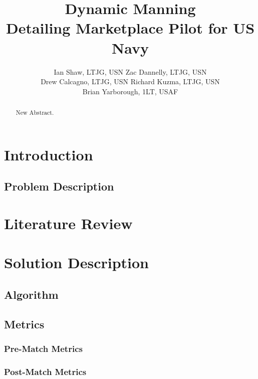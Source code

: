 \documentclass{article}
\title{Dynamic Manning \\ \large Detailing Marketplace Pilot for US Navy}
\author{Ian Shaw, LTJG, USN \quad Zac Dannelly, LTJG, USN \\
Drew Calcagno, LTJG, USN \quad Richard Kuzma, LTJG, USN \\ Brian Yarborough, 1LT, USAF}
\begin{document}
\maketitle

\begin{abstract}
New Abstract.
\end{abstract}


\newpage

\tableofcontents

\newpage

\section{Introduction}



\subsection{Problem Description}



\section{Literature Review}



\section{Solution Description}

\subsection{Algorithm}



\subsection{Metrics}

\subsubsection{Pre-Match Metrics}



\subsubsection{Post-Match Metrics}
\end{document}
